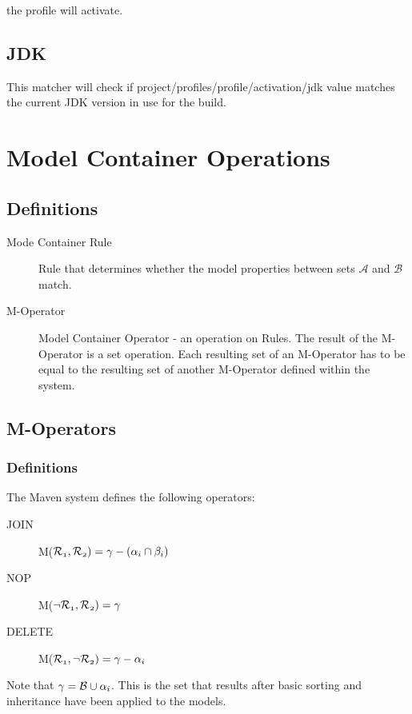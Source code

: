 \documentclass[12pt]{amsart}
\begin{document}
the profile will activate.

\subsection{JDK}
This matcher will check if project/profiles/profile/activation/jdk value matches the current JDK version in use for the build.

\section{Model Container Operations}
\subsection{Definitions}
\begin{description}
\item[Mode Container Rule] Rule that determines whether the model properties between sets \begin{math} \mathcal{A}\end{math} and  \begin{math} \mathcal{B}\end{math} match.  
\item[M-Operator] Model Container Operator - an operation on Rules. The result of the M-Operator is a set operation. Each resulting set of an M-Operator has to be equal to the resulting set of another M-Operator defined within the system.
\end{description}
\subsection{M-Operators}
\subsubsection{Definitions}
The Maven system defines the following operators:
\begin{description}
\item[JOIN]  M($\mathnormal{\mathcal{R}_{1},\mathcal{R}_{2} ) = \gamma - (\alpha_i \cap \beta_i)}$
\item[NOP] M($\mathnormal{\neg \mathcal{R}_{1}, \mathcal{R}_{2})  = \gamma} $ 
\item[DELETE] M($\mathnormal{\mathcal{R}_{1}, \neg \mathcal{R}_{2}) =  \gamma -\alpha_i} $ 
\end{description}
Note that $\mathnormal{\gamma=\mathcal{B}\cup \alpha_i}$. This is the set that results after basic sorting and inheritance have been applied to the models. 
\end{document}
